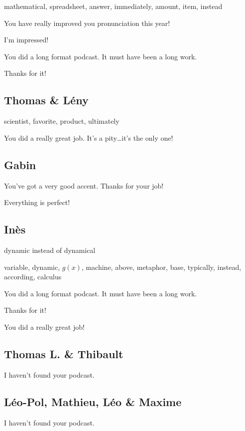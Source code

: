 \documentclass[12pt,oneside]{report}
\begin{document}
\begin{spacing}{1.2}
mathematical, spreadsheet, answer, immediately, amount, item, instead

\color{blue}
You have really improved you pronunciation this year!

I'm impressed!

You did a long format podcast. It must have been a long work.

Thanks for it!
\color{black}


\subsection*{Thomas \& Lény}

scientist, favorite, product, ultimately

\color{blue}
You did a really great job. It's a pity\dots it's the only one!
\color{black}

\subsection*{Gabin}

\color{blue}
You've got a very good accent. Thanks for your job!

Everything is perfect!
\color{black}

\subsection*{Inès}

\color{blue}
dynamic instead of dynamical
\color{black}

variable, dynamic, $g(x)$, machine, above, metaphor, base, typically, instead, according, calculus 

\color{blue}
You did a long format podcast. It must have been a long work.

Thanks for it!

You did a really great job!
\color{black}

\subsection*{Thomas L. \& Thibault}

\color{blue}
I haven't found your podcast.
\color{black}

\subsection*{Léo-Pol, Mathieu, Léo \& Maxime}

\color{blue}
I haven't found your podcast.
\color{black}


\end{spacing}
\end{document}
